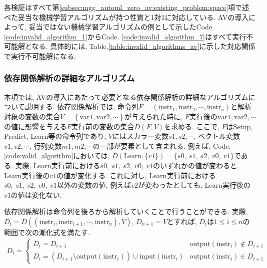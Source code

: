 \documentclass[11pt,oneside,openany,report]{jsbook}
\begin{document}
\noindent
各検証はすべて第\ref{subsec:mgg_automl_zero_av:existing_problem:space}項で述べた妥当な機械学習アルゴリズムが持つ性質と1対1に対応している. AVの導入によって, 妥当ではない機械学習アルゴリズムの例として示したCode. \ref{code:invalid_algorithm_1}からCode. \ref{code:invalid_algorithm_7}はすべて実行不可能解となる. 具体的には, Table.\ref{table:invalid_algorithms_av}に示した対応関係で実行不可能解になる.

\subsubsection{依存関係解析の詳細なアルゴリズム}\label{subsubsec:mgg_automl_zero_av:suggest:av:deps_detail}

本項では, AVの導入にあたって必要となる依存関係解析の詳細なアルゴリズムについて説明する. 依存関係解析では, 命令列$F = (\mathrm{instr}_1, \mathrm{instr}_2, \cdots, \mathrm{instr}_n)$と解析対象の変数の集合$V = \left\{\mathrm{var}1, \mathrm{var}2, \cdots\right\}$が与えられた時に, $F$実行後の$\mathrm{var}1, \mathrm{var}2, \cdots$の値に影響を与える$F$実行前の変数の集合$D(F, V)$を求める. ここで, $F$はSetup, Predict, Learn等の命令列であり, $V$にはスカラー変数$s1,s2,\cdots$, ベクトル変数$v1,v2,\cdots$, 行列変数$m1,m2,\cdots$の一部が要素として含まれる. 例えば, Code. \ref{code:valid_algorithm}においては, $D\left(\mathrm{Learn}, \{ v1 \} \right) = \{ s0,\ s1,\ s2,\ v0,\ v1 \}$である. 実際, Learn実行前における$ s0,\ s1,\ s2,\ v0,\ v1 $のいずれかの値が変わると, Learn実行後の$v1$の値が変化する. これに対し, Learn実行前における$ s0,\ s1,\ s2,\ v0,\ v1 $以外の変数の値, 例えば$v2$が変わったとしても, Learn実行後の$v1$の値は変化ない.

依存関係解析は命令列を後ろから解析していくことで行うことができる. 実際, $D_i = D((\mathrm{instr}_i, \mathrm{instr}_{i+1}, \cdots, \mathrm{instr}_n), V)$,  $D_{n+1} = V$とすれば, $D_i$は$1 \le i \le n$の範囲で次の漸化式を満たす.
\begin{eqnarray}
  D_i=
  \left\{
  \begin{array}{ll}
    D_i = D_{i+1}                                                                                                  & \mathrm{output}(\mathrm{instr}_i) \not\in D_{i+1} \\
    D_i = \left(D_{i+1} \setminus {\mathrm{output}(\mathrm{instr}_i)}\right) \cup \mathrm{input}(\mathrm{instr}_i) & \mathrm{output}(\mathrm{instr}_i) \in D_{i+1}
  \end{array}
  \right.
  \label{fml:deps_recurrence}
\end{eqnarray}
\end{document}
